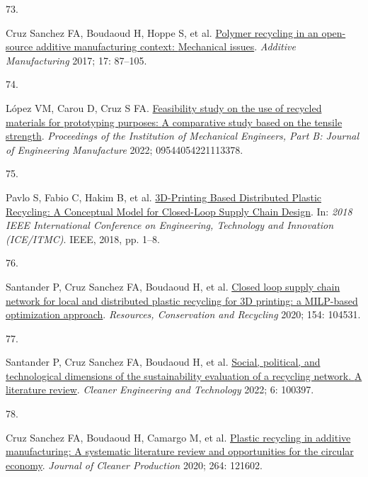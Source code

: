 \documentclass[
  11pt,
  a4paperpaper,
  onecolumn]{article}
\newlength{\cslhangindent}
\newlength{\csllabelwidth}
\newlength{\cslentryspacingunit} %
\newenvironment{CSLReferences}[2] %
 {%
  \setlength{\parindent}{0pt}
  \ifodd #1
  \let\oldpar\par
  \def\par{\hangindent=\cslhangindent\oldpar}
  \fi
  \setlength{\parskip}{#2\cslentryspacingunit}
 }%
 {}
\newcommand{\CSLLeftMargin}[1]{\parbox[t]{\csllabelwidth}{#1}}
\newcommand{\CSLRightInline}[1]{\parbox[t]{\linewidth - \csllabelwidth}{#1}\break}
\begin{document}
\begin{CSLReferences}{0}{0}
\leavevmode{}%
\CSLLeftMargin{73. }%
\CSLRightInline{Cruz Sanchez FA, Boudaoud H, Hoppe S, et al.
\href{https://doi.org/10.1016/j.addma.2017.05.013}{Polymer recycling in
an open-source additive manufacturing context: {Mechanical} issues}.
\emph{Additive Manufacturing} 2017; 17: 87--105.}

\leavevmode{}%
\CSLLeftMargin{74. }%
\CSLRightInline{López VM, Carou D, Cruz S FA.
\href{https://doi.org/10.1177/09544054221113378}{Feasibility study on
the use of recycled materials for prototyping purposes: {A} comparative
study based on the tensile strength}. \emph{Proceedings of the
Institution of Mechanical Engineers, Part B: Journal of Engineering
Manufacture} 2022; 09544054221113378.}

\leavevmode{}%
\CSLLeftMargin{75. }%
\CSLRightInline{Pavlo S, Fabio C, Hakim B, et al.
\href{https://doi.org/10.1109/ICE.2018.8436296}{{3D-Printing Based
Distributed Plastic Recycling}: {A Conceptual Model} for {Closed-Loop
Supply Chain Design}}. In: \emph{2018 {IEEE International Conference} on
{Engineering}, {Technology} and {Innovation} ({ICE}/{ITMC})}. {IEEE},
2018, pp. 1--8.}

\leavevmode{}%
\CSLLeftMargin{76. }%
\CSLRightInline{Santander P, Cruz Sanchez FA, Boudaoud H, et al.
\href{https://doi.org/10.1016/j.resconrec.2019.104531}{{Closed loop
supply chain network for local and distributed plastic recycling for 3D
printing: a MILP-based optimization approach}}. \emph{Resources,
Conservation and Recycling} 2020; 154: 104531.}

\leavevmode{}%
\CSLLeftMargin{77. }%
\CSLRightInline{Santander P, Cruz Sanchez FA, Boudaoud H, et al.
\href{https://doi.org/10.1016/j.clet.2022.100397}{Social, political, and
technological dimensions of the sustainability evaluation of a recycling
network. {A} literature review}. \emph{Cleaner Engineering and
Technology} 2022; 6: 100397.}

\leavevmode{}%
\CSLLeftMargin{78. }%
\CSLRightInline{Cruz Sanchez FA, Boudaoud H, Camargo M, et al.
\href{https://doi.org/10.1016/j.jclepro.2020.121602}{Plastic recycling
in additive manufacturing: {A} systematic literature review and
opportunities for the circular economy}. \emph{Journal of Cleaner
Production} 2020; 264: 121602.}


\end{CSLReferences}
\end{document}
